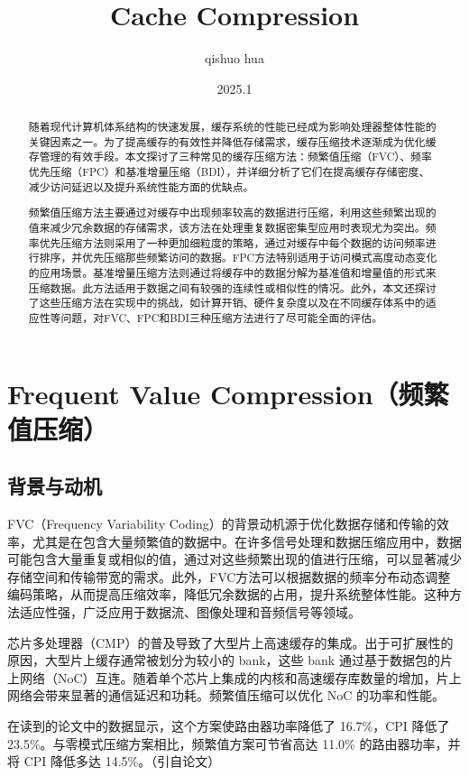 \documentclass[12pt]{article}
\title{Cache Compression}
\author{qishuo hua}
\date{2025.1}
\begin{document}
\maketitle

\begin{abstract}
随着现代计算机体系结构的快速发展，缓存系统的性能已经成为影响处理器整体性能的关键因素之一。为了提高缓存的有效性并降低存储需求，缓存压缩技术逐渐成为优化缓存管理的有效手段。本文探讨了三种常见的缓存压缩方法：频繁值压缩（FVC）、频率优先压缩（FPC）和基准增量压缩（BDI），并详细分析了它们在提高缓存存储密度、减少访问延迟以及提升系统性能方面的优缺点。

频繁值压缩方法主要通过对缓存中出现频率较高的数据进行压缩，利用这些频繁出现的值来减少冗余数据的存储需求，该方法在处理重复数据密集型应用时表现尤为突出。频率优先压缩方法则采用了一种更加细粒度的策略，通过对缓存中每个数据的访问频率进行排序，并优先压缩那些频繁访问的数据。FPC方法特别适用于访问模式高度动态变化的应用场景。基准增量压缩方法则通过将缓存中的数据分解为基准值和增量值的形式来压缩数据。此方法适用于数据之间有较强的连续性或相似性的情况。此外，本文还探讨了这些压缩方法在实现中的挑战，如计算开销、硬件复杂度以及在不同缓存体系中的适应性等问题，对FVC、FPC和BDI三种压缩方法进行了尽可能全面的评估。
\end{abstract}

\section{Frequent Value Compression（频繁值压缩）}

\subsection{背景与动机}
FVC（Frequency Variability Coding）的背景动机源于优化数据存储和传输的效率，尤其是在包含大量频繁值的数据中。在许多信号处理和数据压缩应用中，数据可能包含大量重复或相似的值，通过对这些频繁出现的值进行压缩，可以显著减少存储空间和传输带宽的需求。此外，FVC方法可以根据数据的频率分布动态调整编码策略，从而提高压缩效率，降低冗余数据的占用，提升系统整体性能。这种方法适应性强，广泛应用于数据流、图像处理和音频信号等领域。

芯片多处理器（CMP）的普及导致了大型片上高速缓存的集成。出于可扩展性的原因，大型片上缓存通常被划分为较小的 bank，这些 bank 通过基于数据包的片上网络（NoC）互连。随着单个芯片上集成的内核和高速缓存库数量的增加，片上网络会带来显著的通信延迟和功耗。频繁值压缩可以优化 NoC 的功率和性能。

在读到的论文中的数据显示，这个方案使路由器功率降低了 16.7\%，CPI 降低了 23.5\%。与零模式压缩方案相比，频繁值方案可节省高达 11.0\% 的路由器功率，并将 CPI 降低多达 14.5\%。（引自论文）
\end{document}
